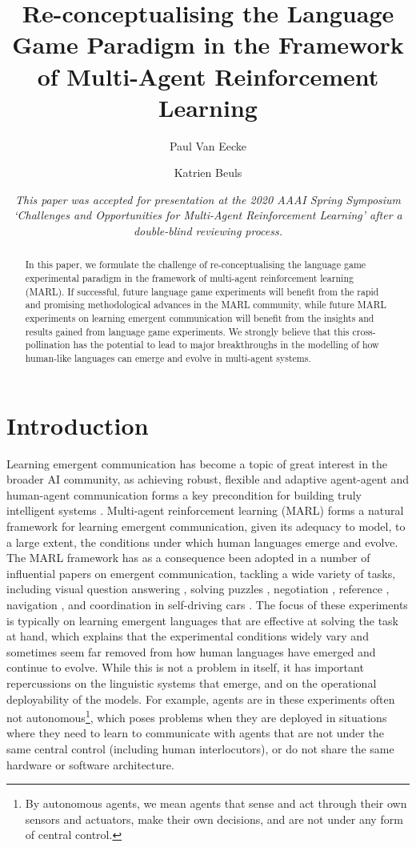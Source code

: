 \documentclass[a4paper,abstract]{scrartcl}
\title{\Large Re-conceptualising the Language Game Paradigm in the Framework of Multi-Agent Reinforcement Learning}
\author[1,2]{Paul Van Eecke}
\author[1]{Katrien Beuls}
\affil[1]{Artificial Intelligence Laboratory, Vrije Universiteit Brussel \protect\\ Pleinlaan 2, 1050 Brussels, Belgium}
\affil[2]{ ITEC, imec research group at KU Leuven \protect\\ E. Sabbelaan 53, 8500 Kortrijk, Belgium }
\date{\small \textit{This paper was accepted for presentation at the 2020 AAAI Spring Symposium `Challenges and Opportunities for Multi-Agent Reinforcement Learning' after a double-blind reviewing process.}}
\begin{document}
\maketitle

\begin{abstract} 
\noindent
In this paper, we formulate the challenge of re-conceptualising the language game experimental paradigm in the framework of multi-agent reinforcement learning (MARL). If successful, future language game experiments will benefit from the rapid and promising methodological advances in the MARL community, while future MARL experiments on learning emergent communication will benefit from the insights and results gained from language game experiments. We strongly believe that this cross-pollination has the potential to lead to major breakthroughs in the modelling of how human-like languages can emerge and evolve in multi-agent systems.
\end{abstract}

\noindent 

\section{Introduction}
Learning emergent communication has become a topic of great interest in the broader AI community, as achieving robust, flexible and adaptive agent-agent and human-agent communication forms a key precondition for building truly intelligent systems \citep{mikolov2016roadmap}.  Multi-agent reinforcement learning (MARL) forms a natural framework for learning emergent communication, given its adequacy to model, to a large extent, the conditions under which human languages emerge and evolve. The MARL framework has as a consequence been adopted in a number of influential papers on emergent communication, tackling a wide variety of tasks, including visual question answering \citep{das2017learning}, solving puzzles \citep{foerster2016learning}, negotiation \citep{cao2018emergent}, reference \citep{lazaridou2016multi}, navigation \citep{sukhbaatar2016learning,bogin2018emergence,mordatch2018emergence}, and coordination in self-driving cars \citep{resnick2018vehicle}. The focus of these experiments is typically on learning emergent languages that are effective at solving the task at hand, which explains that the experimental conditions widely vary and sometimes seem far removed from how human languages have emerged and continue to evolve. While this is not a problem in itself, it has important repercussions on the linguistic systems that emerge, and on the operational deployability of the models. For example, agents are in these experiments often not autonomous\footnote{By autonomous agents, we mean agents that sense and act through their own sensors and actuators, make their own decisions, and are not under any form of central control.}, which poses problems when they are deployed in situations where they need to learn to communicate with agents that are not under the same central control (including human interlocutors), or do not share the same hardware or software architecture. 
\end{document}
